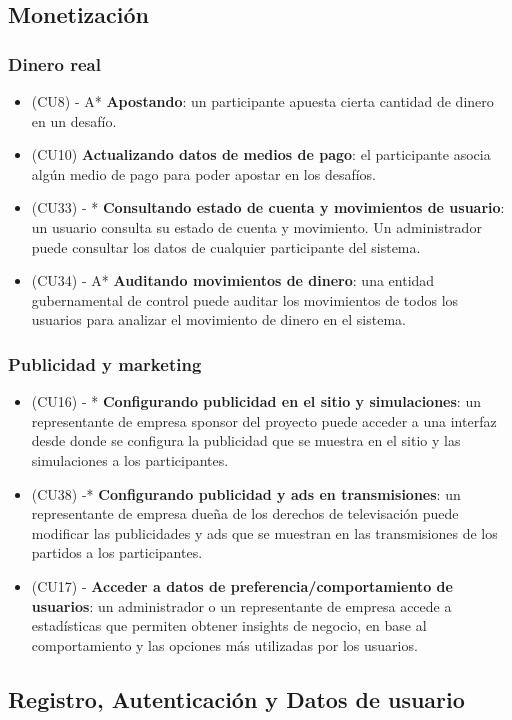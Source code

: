 \subsection{Monetización}
\subsubsection{Dinero real}
\begin{itemize}
\item (CU8) - A* \textbf{Apostando}: un participante apuesta cierta cantidad de dinero en un desafío.
\item (CU10) \textbf{Actualizando datos de medios de pago}: el participante asocia algún medio de pago para poder apostar en los desafíos.
\item (CU33) - * \textbf{Consultando estado de cuenta y movimientos de usuario}: un usuario consulta su estado de cuenta y movimiento. Un administrador puede consultar los datos de cualquier participante del sistema.
\item (CU34) - A* \textbf{Auditando movimientos de dinero}: una entidad gubernamental de control puede auditar los movimientos de todos los usuarios para analizar el movimiento de dinero en el sistema.
\end{itemize}

\subsubsection{Publicidad y marketing}
\begin{itemize}
\item (CU16) - * \textbf{Configurando publicidad en el sitio y simulaciones}: un representante de empresa sponsor del proyecto puede acceder a una interfaz desde donde se configura la publicidad que se muestra en el sitio y las simulaciones a los participantes.
\item (CU38) -* \textbf{Configurando publicidad y ads en transmisiones}: un representante de empresa dueña de los derechos de televisación puede modificar las publicidades y ads que se muestran en las transmisiones de los partidos a los participantes.
\item (CU17) - \textbf{Acceder a datos de preferencia/comportamiento de usuarios}: un administrador o un representante de empresa accede a estadísticas que permiten obtener insights de negocio, en base al comportamiento y las opciones más utilizadas por los usuarios.
\end{itemize}

\subsection{Registro, Autenticación y Datos de usuario}

